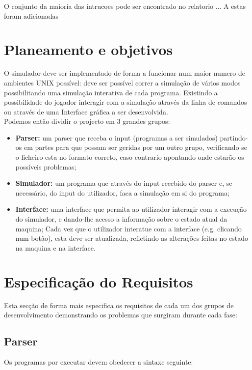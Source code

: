 \documentclass{report}
\begin{document}
\quad O conjunto da maioria das intrucoes pode ser encontrado no relatorio ...
A estas foram adicionadas

\section{Planeamento e objetivos}
\quad O simulador deve ser implementado de forma a funcionar num maior numero de ambientes UNIX possível:
deve ser possível correr a simulação de vários modos possibilitando uma simulação interativa de cada programa.
Existindo a possibilidade do jogador interagir com a simulação através da linha de comandos ou através de uma Interface
gráfica a ser desenvolvida.\\
\null\quad Podemos então dividir o projecto em 3 grandes grupos:
\begin{itemize}
	\item \textbf{Parser:} um parser que receba o input
	(programas a ser simulados) partindo-os em partes para que possam ser geridas por um outro grupo,
	verificando se o ficheiro esta no formato correto, caso contrario apontando onde estarão os possíveis problemas;

	\item \textbf{Simulador:} um programa que através do input recebido do parser e, se necessário, do input do utilizador,
	faca a simulação em si do programa;

	\item \textbf{Interface:} uma interface que permita ao utilizador interagir com a execução do simulador,
	e dando-lhe acesso a informação sobre o estado atual da maquina;
	Cada vez que o utilizador interatue com a interface (e.g. clicando num botão), esta deve ser atualizada,
	refletindo as alterações feitas no estado na maquina e na interface.
\end{itemize}

\section{Especificação do Requisitos}
\quad Esta secção de forma mais especifica os requisitos de cada um dos grupos de desenvolvimento demonstrando os problemas que
surgiram durante cada fase:

\subsection{Parser}

\quad Os programas por executar devem obedecer a sintaxe seguinte:
\end{document}
